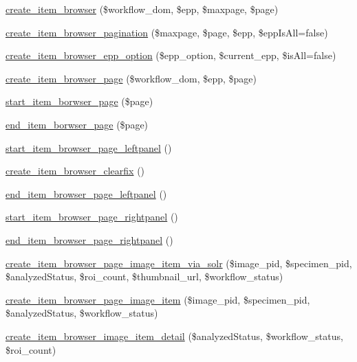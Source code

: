 \begin{DoxyCompactItemize}
\hyperlink{workspace_8functions_8php_af670bf78ce8af176b5de1710630a5566}{create\_\-item\_\-browser} (\$workflow\_\-dom, \$epp, \$maxpage, \$page)
\item 
\hyperlink{workspace_8functions_8php_aa0e5888c6f195e90dc99b2d94d6a5fd4}{create\_\-item\_\-browser\_\-pagination} (\$maxpage, \$page, \$epp, \$eppIsAll=false)
\item 
\hyperlink{workspace_8functions_8php_ac16a70ff976e88b8a1c6d765606bde1a}{create\_\-item\_\-browser\_\-epp\_\-option} (\$epp\_\-option, \$current\_\-epp, \$isAll=false)
\item 
\hyperlink{workspace_8functions_8php_a2a83a520847eb4ca467cfc78b462ed5a}{create\_\-item\_\-browser\_\-page} (\$workflow\_\-dom, \$epp, \$page)
\item 
\hyperlink{workspace_8functions_8php_afe5f63794b763b609679ddb4eb7016c2}{start\_\-item\_\-borwser\_\-page} (\$page)
\item 
\hyperlink{workspace_8functions_8php_a02118ba92691034863d360d75a8322f9}{end\_\-item\_\-borwser\_\-page} (\$page)
\item 
\hyperlink{workspace_8functions_8php_ac8190dcd062e7bdbe5026c21bbf07cac}{start\_\-item\_\-browser\_\-page\_\-leftpanel} ()
\item 
\hyperlink{workspace_8functions_8php_a5abdc0ec35a882364969312123d974c4}{create\_\-item\_\-browser\_\-clearfix} ()
\item 
\hyperlink{workspace_8functions_8php_a1eaf28245e9f14205d262f64e45f439c}{end\_\-item\_\-browser\_\-page\_\-leftpanel} ()
\item 
\hyperlink{workspace_8functions_8php_a7044e5b0e90c5de508336ab880c5c478}{start\_\-item\_\-browser\_\-page\_\-rightpanel} ()
\item 
\hyperlink{workspace_8functions_8php_acb615cddac4ba844bc7c8dbbba394b37}{end\_\-item\_\-browser\_\-page\_\-rightpanel} ()
\item 
\hyperlink{workspace_8functions_8php_a1dd11ac45a65b79f00a6e03a19c4d7ea}{create\_\-item\_\-browser\_\-page\_\-image\_\-item\_\-via\_\-solr} (\$image\_\-pid, \$specimen\_\-pid, \$analyzedStatus, \$roi\_\-count, \$thumbnail\_\-url, \$workflow\_\-status)
\item 
\hyperlink{workspace_8functions_8php_ab15550a7aa0b4e5495fd073d7c10cb4e}{create\_\-item\_\-browser\_\-page\_\-image\_\-item} (\$image\_\-pid, \$specimen\_\-pid, \$analyzedStatus, \$workflow\_\-status)
\item 
\hyperlink{workspace_8functions_8php_a011940edca79f7189587b42798ac7f7e}{create\_\-item\_\-browser\_\-image\_\-item\_\-detail} (\$analyzedStatus, \$workflow\_\-status, \$roi\_\-count)

\end{DoxyCompactItemize}
